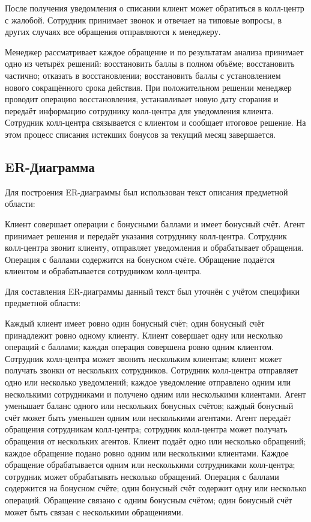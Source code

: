 \documentclass[11pt,a4paper,final]{article}
\begin{document}
После получения уведомления о списании клиент может обратиться в колл-центр
с жалобой. Сотрудник принимает звонок и отвечает на типовые вопросы, в других случаях все обращения отправляются к менеджеру.

Менеджер рассматривает каждое обращение и по результатам анализа
принимает одно из четырёх решений: восстановить баллы в полном объёме; восстановить
частично; отказать в восстановлении; восстановить баллы с установлением
нового сокращённого срока действия. При положительном решении менеджер проводит операцию
восстановления, устанавливает новую дату сгорания и передаёт информацию
сотруднику колл-центра для уведомления клиента. Сотрудник колл-центра
связывается с клиентом и сообщает итоговое решение. На этом процесс списания
истекших бонусов за текущий месяц завершается.

\subsection{ER-Диаграмма}

Для построения ER-диаграммы был использован текст описания предметной области:

Клиент совершает операции с бонусными баллами и имеет бонусный счёт. Агент
принимает решения и передаёт указания сотруднику колл-центра. Сотрудник колл-центра звонит клиенту, отправляет уведомления и обрабатывает обращения. Операция с баллами содержится на бонусном счёте. Обращение подаётся клиентом и обрабатывается сотрудником колл-центра.

Для составления ER-диаграммы данный текст был уточнён с учётом специфики
предметной области:

Каждый клиент имеет ровно один бонусный счёт; один бонусный счёт
принадлежит ровно одному клиенту. Клиент совершает одну или несколько операций
с баллами; каждая операция совершена ровно одним клиентом. Сотрудник
колл-центра может звонить нескольким клиентам; клиент может получать звонки от
нескольких сотрудников. Сотрудник колл-центра отправляет одно или несколько
уведомлений; каждое уведомление отправлено одним или несколькими сотрудниками и получено одним или несколькими клиентами. Агент уменьшает баланс одного или нескольких бонусных счётов; каждый бонусный счёт может быть уменьшен одним или несколькими агентами. Агент передаёт обращения сотрудникам колл-центра; сотрудник колл-центра может получать обращения от нескольких агентов. Клиент подаёт одно или несколько обращений; каждое обращение подано ровно одним или несколькими клиентами. Каждое обращение обрабатывается одним или несколькими сотрудниками колл-центра; сотрудник может обрабатывать несколько обращений. Операция с баллами содержится на бонусном счёте; один бонусный счёт содержит одну или несколько операций. Обращение связано с одним бонусным счётом; один бонусный счёт может быть связан с несколькими обращениями.
\end{document}
